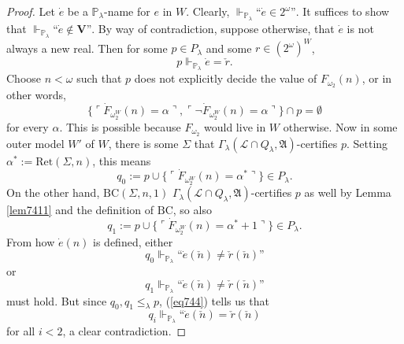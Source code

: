\documentclass[12pt, twoside]{memoir}
\numberwithin{equation}{section}
\theoremstyle{definition}
\theoremstyle{remark}
\theoremstyle{definition}
\theoremstyle{definition}
\theoremstyle{definition}
\theoremstyle{remark}
\begin{document}
\begin{proof}
Let $\dot{e}$ be a $\mathbb{P}_{\lambda}$-name for $e$ in $W$. Clearly, $\Vdash_{\mathbb{P}_{\lambda}} \text{``} \dot{e} \in 2^{\omega} \text{''}$. It suffices to show that $\Vdash_{\mathbb{P}_{\lambda}} \text{``} \dot{e} \not\in \mathbf{V} \text{''}$. By way of contradiction, suppose otherwise, that $\dot{e}$ is not always a new real. Then for some $p \in P_{\lambda}$ and some $r \in (2^{\omega})^W$, 
\begin{equation}\label{eq744}
    p \Vdash_{\mathbb{P}_{\lambda}} \dot{e} = \check{r} \text{.}
\end{equation} 
Choose $n < \omega$ such that $p$ does not explicitly decide the value of $F_{\omega_2}(n)$, or in other words,
\begin{equation*}
    \{\ulcorner \dot{F}_{\omega_2^W}(n) = \alpha \urcorner, \ulcorner \neg \dot{F}_{\omega_2^W}(n) = \alpha \urcorner\} \cap p = \emptyset
\end{equation*}
for every $\alpha$. This is possible because $F_{\omega_2}$ would live in $W$ otherwise. Now in some outer model $W'$ of $W$, there is some $\Sigma$ that $\Gamma_{\lambda} (\mathcal{L} \cap Q_{\lambda}, \mathfrak{A})$-certifies $p$. Setting $\alpha^* := \mathrm{Ret}(\Sigma, n)$, this means 
\begin{equation*}
    q_0 := p \cup \{\ulcorner \dot{F}_{\omega_2^W}(n) = \alpha^* \urcorner\} \in P_{\lambda} \text{.}
\end{equation*} 
On the other hand, $\mathrm{BC}(\Sigma, n, 1)$ $\Gamma_{\lambda} (\mathcal{L} \cap Q_{\lambda}, \mathfrak{A})$-certifies $p$ as well by Lemma \ref{lem7411} and the definition of $\mathrm{BC}$, so also 
\begin{equation*}
    q_1 := p \cup \{\ulcorner \dot{F}_{\omega_2^W}(n) = \alpha^* + 1 \urcorner\} \in P_{\lambda} \text{.}
\end{equation*}
From how $\dot{e}(n)$ is defined, either
\begin{equation*}
    q_0 \Vdash_{\mathbb{P}_{\lambda}} \text{``}\dot{e}(\check{n}) \neq \check{r}(\check{n}) \text{''}
\end{equation*}
or 
\begin{equation*}
    q_1 \Vdash_{\mathbb{P}_{\lambda}} \text{``}\dot{e}(\check{n}) \neq \check{r}(\check{n}) \text{''}
\end{equation*}
must hold. But since $q_0, q_1 \leq_{\lambda} p$, (\ref{eq744}) tells us that
\begin{equation*}
    q_i \Vdash_{\mathbb{P}_{\lambda}} \text{``}\dot{e}(\check{n}) = \check{r}(\check{n})
\end{equation*}
for all $i < 2$, a clear contradiction.
\end{proof}
\end{document}
